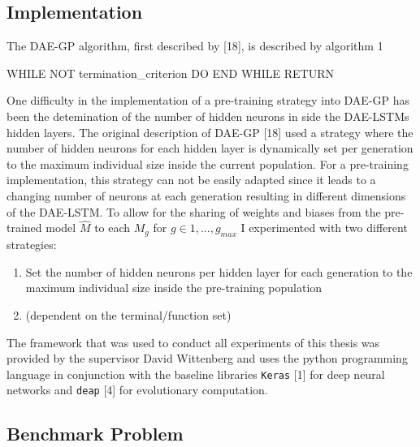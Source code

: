 \documentclass[
  11pt,
]{article}
\newenvironment{Shaded}{\begin{snugshade}}{\end{snugshade}}
\newcommand{\NormalTok}[1]{#1}
\providecommand{\tightlist}{%
  \setlength{\itemsep}{0pt}\setlength{\parskip}{0pt}}
\begin{document}
\hypertarget{implementation}{%
\subsection{Implementation}\label{implementation}}

The DAE-GP algorithm, first described by {[}18{]}, is described by algorithm 1

\begin{Shaded}
\begin{Highlighting}[numbers=left,,]
\NormalTok{WHILE NOT termination\_criterion}
\NormalTok{  DO }
\NormalTok{END WHILE}
\NormalTok{RETURN}
\end{Highlighting}
\end{Shaded}

One difficulty in the implementation of a pre-training strategy into DAE-GP has been the detemination of the number of hidden neurons in side the DAE-LSTMs hidden layers. The original description of DAE-GP {[}18{]} used a strategy where the number of hidden neurons for each hidden layer is dynamically set per generation to the maximum individual size inside the current population.
For a pre-training implementation, this strategy can not be easily adapted since it leads to a changing number of neurons at each generation resulting in different dimensions of the DAE-LSTM. To allow for the sharing of weights and biases from the pre-trained model \(\hat{M}\) to each \(M_g\) for \(g\in{1,...,g_{max}}\) I experimented with two different strategies:

\begin{enumerate}
\def\labelenumi{\arabic{enumi}.}
\tightlist
\item
  Set the number of hidden neurons per hidden layer for each generation to the maximum individual size inside the pre-training population
\item
  (dependent on the terminal/function set)
\end{enumerate}

The framework that was used to conduct all experiments of this thesis was provided by the supervisor David Wittenberg and uses the python programming language in conjunction with the baseline libraries \texttt{Keras} {[}1{]} for deep neural networks and \texttt{deap} {[}4{]} for evolutionary computation.

\hypertarget{benchmark-problem}{%
\subsection{Benchmark Problem}\label{benchmark-problem}}
\end{document}
